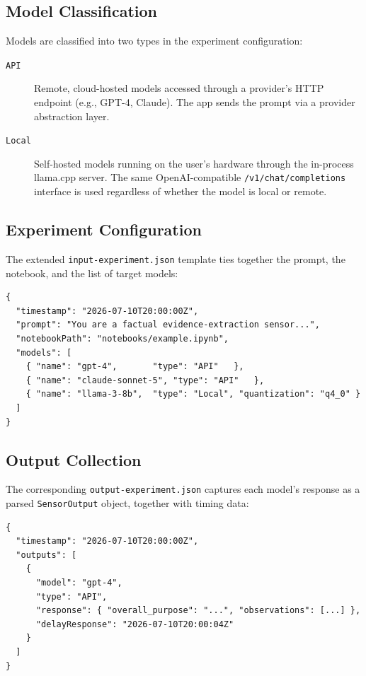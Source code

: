 \documentclass[11pt, a4paper]{article}
\begin{document}
\subsection{Model Classification}

Models are classified into two types in the experiment configuration:

\begin{description}
  \item[\texttt{API}] Remote, cloud-hosted models accessed through a
        provider's HTTP endpoint (e.g., GPT-4, Claude). The app sends the
        prompt via a provider abstraction layer.

  \item[\texttt{Local}] Self-hosted models running on the user's hardware
        through the in-process llama.cpp server. The same OpenAI-compatible
        \texttt{/v1/chat/completions} interface is used regardless of
        whether the model is local or remote.
\end{description}

\subsection{Experiment Configuration}

The extended \texttt{input-experiment.json} template ties together the prompt,
the notebook, and the list of target models:

\begin{lstlisting}[style=json]
{
  "timestamp": "2026-07-10T20:00:00Z",
  "prompt": "You are a factual evidence-extraction sensor...",
  "notebookPath": "notebooks/example.ipynb",
  "models": [
    { "name": "gpt-4",       "type": "API"   },
    { "name": "claude-sonnet-5", "type": "API"   },
    { "name": "llama-3-8b",  "type": "Local", "quantization": "q4_0" }
  ]
}
\end{lstlisting}

\subsection{Output Collection}

The corresponding \texttt{output-experiment.json} captures each model's
response as a parsed \texttt{SensorOutput} object, together with timing
data:

\begin{lstlisting}[style=json]
{
  "timestamp": "2026-07-10T20:00:00Z",
  "outputs": [
    {
      "model": "gpt-4",
      "type": "API",
      "response": { "overall_purpose": "...", "observations": [...] },
      "delayResponse": "2026-07-10T20:00:04Z"
    }
  ]
}
\end{lstlisting}
\end{document}
